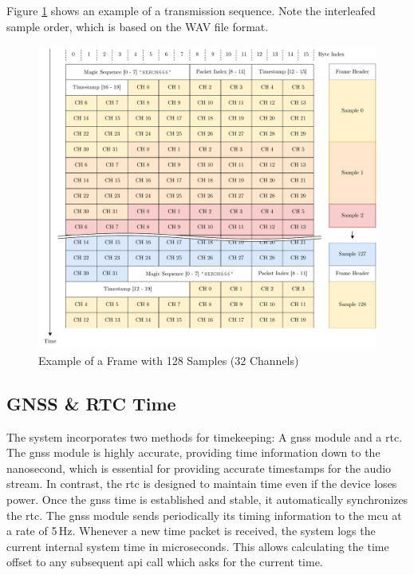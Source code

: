 Figure \ref{fig:frame_example} shows an example of a transmission sequence.
Note the interleafed sample order, which is based on the WAV file format.
\begin{figure}[h]
	\centering
	\includegraphics[width=1.0\textwidth]{images/6_design_final/Audio_Stream_Frame.pdf}
	\caption{Example of a Frame with 128 Samples (32 Channels)}
	\label{fig:frame_example}
\end{figure}

\newpage
\subsection{GNSS \& RTC Time}
The system incorporates two methods for timekeeping: A \acrshort{gnss} module and a \acrfull{rtc}.
The \acrshort{gnss} module is highly accurate, providing time information down to the nanosecond, which is essential for providing accurate timestamps for the audio stream.
In contrast, the \acrshort{rtc} is designed to maintain time even if the device loses power.
Once the \acrshort{gnss} time is established and stable, it automatically synchronizes the \acrshort{rtc}.
The \acrshort{gnss} module sends periodically its timing information to the \acrshort{mcu} at a rate of 5\,Hz.
Whenever a new time packet is received, the system logs the current internal system time in microseconds.
This allows calculating the time offset to any subsequent \acrshort{api} call which asks for the current time.

